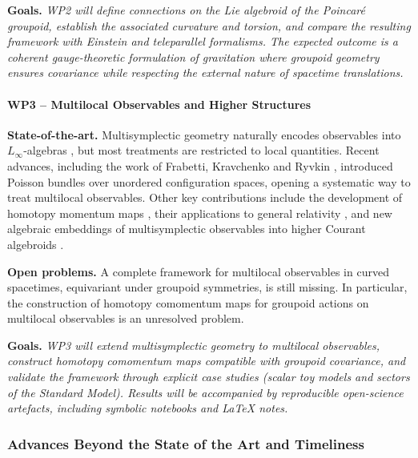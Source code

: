 \documentclass[11pt]{msca-pf}
\begin{document}
\textbf{Goals.} \emph{WP2 will define connections on the Lie algebroid of the Poincaré groupoid, establish the associated curvature and torsion, and compare the resulting framework with Einstein and teleparallel formalisms. The expected outcome is a coherent gauge-theoretic formulation of gravitation where groupoid geometry ensures covariance while respecting the external nature of spacetime translations.}

\paragraph{WP3 – Multilocal Observables and Higher Structures}  

\textbf{State-of-the-art.} Multisymplectic geometry naturally encodes observables into $L_\infty$-algebras \cite{Rogers2010}, but most treatments are restricted to local quantities. Recent advances, including the work of Frabetti, Kravchenko and Ryvkin \cite{Frabetti2025}, introduced Poisson bundles over unordered configuration spaces, opening a systematic way to treat multilocal observables. Other key contributions include the development of homotopy momentum maps \cite{Callies2016}, their applications to general relativity \cite{Blohmann2023}, and new algebraic embeddings of multisymplectic observables into higher Courant algebroids \cite{Miti2022}.  

\textbf{Open problems.} A complete framework for multilocal observables in curved spacetimes, equivariant under groupoid symmetries, is still missing. In particular, the construction of homotopy comomentum maps for groupoid actions on multilocal observables is an unresolved problem.

\textbf{Goals.} \emph{WP3 will extend multisymplectic geometry to multilocal observables, construct homotopy comomentum maps compatible with groupoid covariance, and validate the framework through explicit case studies (scalar toy models and sectors of the Standard Model). Results will be accompanied by reproducible open-science artefacts, including symbolic notebooks and LaTeX notes.}




\subsubsection*{Advances Beyond the State of the Art and Timeliness}
\end{document}
